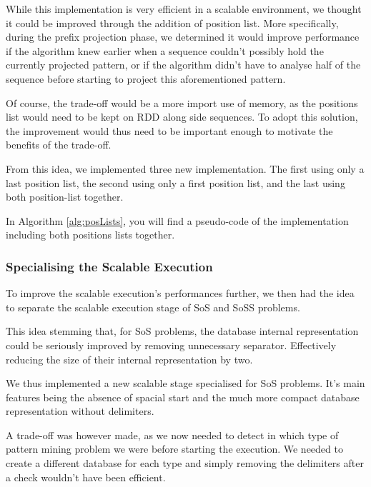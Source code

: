 \documentclass{eplmastersthesis}
\begin{document}
While this implementation is very efficient in a scalable environment, we thought it could be improved through the addition of position list. More specifically, during the prefix projection phase, we determined it would improve performance if the algorithm knew earlier when a sequence couldn't possibly hold the currently projected pattern, or if the algorithm didn't have to analyse half of the sequence before starting to project this aforementioned pattern. \newline

Of course, the trade-off would be a more import use of memory, as the positions list would need to be kept on RDD along side sequences. To adopt this solution, the improvement would thus need to be important enough to motivate the benefits of the trade-off. \newline

From this idea, we implemented three new implementation. The first using only a last position list, the second using only a first position list, and the last using both position-list together. \newline

In Algorithm \ref{alg:posLists}, you will find a pseudo-code of the implementation including both positions lists together.

\subsubsection{Specialising the Scalable Execution}

To improve the scalable execution's performances further, we then had the idea to separate the scalable execution stage of \acrshort{SoS} and \acrshort{SoSS} problems.

This idea stemming that, for \acrshort{SoS} problems, the database internal representation could be seriously improved by removing unnecessary separator. Effectively reducing the size of their internal representation by two. \newline

We thus implemented a new scalable stage specialised for \acrlong{SoS} problems. It's main features being the absence of spacial start and the much more compact database representation without delimiters. \newline

A trade-off was however made, as we now needed to detect in which type of pattern mining problem we were before starting the execution. We needed to create a different database for each type and simply removing the delimiters after a check wouldn't have been efficient. \newline
\end{document}
